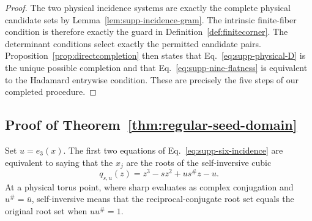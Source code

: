 \documentclass[aps,prx,reprint,nofootinbib,twoside,superscriptaddress,longbibliography,floatfix]{revtex4-2}
\theoremstyle{definition}
\begin{document}
\begin{proof}
The two physical incidence systems are exactly the complete physical candidate sets by Lemma~\ref{lem:supp-incidence-gram}.  The intrinsic finite-fiber condition is therefore exactly the guard in Definition~\ref{def:finitecorner}.  The determinant conditions select exactly the permitted candidate pairs. Proposition~\ref{prop:directcompletion} then states that Eq.~\eqref{eq:supp-physical-D} is the unique possible completion and that Eq.~\eqref{eq:supp-nine-flatness} is equivalent to the Hadamard entrywise condition.  These are precisely the five steps of our completed procedure.
\end{proof}

\subsection{{Proof of Theorem~\ref{thm:regular-seed-domain}}}
\label{sec:supp-generic-cover}

Set $u=e_3(x)$.  The first two equations of Eq.~\eqref{eq:supp-six-incidence} are equivalent to saying that the $x_j$ are the roots of the self-inversive cubic
\begin{equation}
q_{s,u}(z)=z^3-sz^2+us^\#z-u.
\label{eq:supp-product-cubic}
\end{equation}
At a physical torus point, where sharp evaluates as complex conjugation and $u^\#=\overline u$, self-inversive means that the reciprocal-conjugate root set equals the original root set when $uu^\#=1$.
\end{document}
